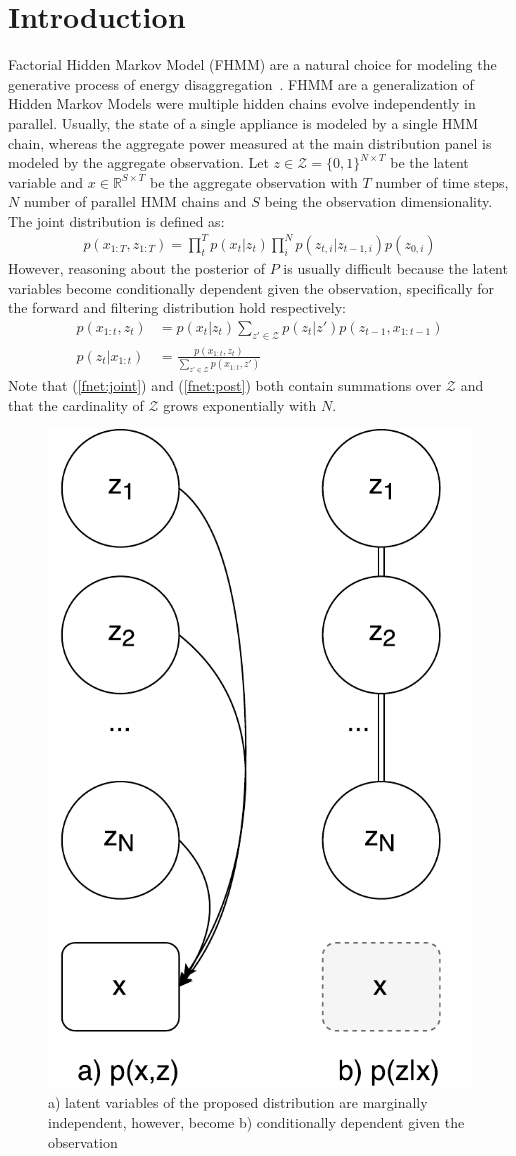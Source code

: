 \section{Introduction}
Factorial Hidden Markov Model \cite{ghahramani1997factorial} (FHMM) are a natural choice for modeling the generative process of energy disaggregation~\cite{kolter2012fhmm,lange2016varbolt,ng2016scaling,hart1992}. FHMM are a generalization of Hidden Markov Models were multiple hidden chains evolve independently in parallel. Usually, the state of a single appliance is modeled by a single HMM chain, whereas the aggregate power measured at the main distribution panel is modeled by the aggregate observation. Let $z \in \mathcal{Z} = \{0,1\}^{N \times T}$ be the latent variable and $x \in \mathbb{R}^{S \times T}$ be the aggregate observation with $T$ number of time steps, $N$ number of parallel HMM chains and $S$ being the observation dimensionality. The joint distribution is defined as: \begin{align*}
p(x_{1:T},z_{1:T}) = \prod_t^T p(x_t|z_t)\prod_i^N p(z_{t,i}|z_{t-1,i})p(z_{0,i})
\end{align*} However, reasoning about the posterior of $P$ is usually difficult because the latent variables become conditionally dependent given the observation, specifically for the forward and filtering distribution hold respectively:
\begin{align}
p(x_{1:t},z_t) &= p(x_t|z_t) \sum_{z' \in \mathcal{Z}} p(z_t|z') p(z_{t-1}, x_{1:t-1}) \label{fnet:joint}\\
p(z_t|x_{1:t}) &= \frac{p(x_{1:t},z_t)}{\sum_{z' \in \mathcal{Z}} p(x_{1:t},z')} \label{fnet:post}
\end{align}
Note that (\ref{fnet:joint}) and (\ref{fnet:post}) both contain summations over $\mathcal{Z}$ and that the cardinality of $\mathcal{Z}$ grows exponentially with $N$.\\
\begin{figure}[!t]
\centering
\includegraphics[width=0.4\linewidth]{factornet/graphmod.pdf}
\caption[FactorNet: Latent variable models and independence structure.]{a) latent variables of the proposed distribution are marginally independent, however, become b) conditionally dependent given the observation}
\label{fnet:graphmod}
\end{figure}
